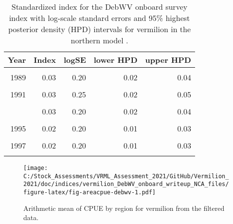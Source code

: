 \documentclass[
]{article}
\begin{document}
\FloatBarrier

\begin{table}

\caption{\label{tab:tab-index-debwv}Standardized index for the DebWV onboard survey index with log-scale standard errors and 95\% highest
       posterior density (HPD) intervals for vermilion in the northern model .}
\centering
\begin{tabular}[t]{rrrrr}
\toprule
Year & Index & logSE & lower HPD & upper HPD\\
\midrule
\cellcolor{gray!6}{1988} & \cellcolor{gray!6}{0.02} & \cellcolor{gray!6}{0.22} & \cellcolor{gray!6}{0.01} & \cellcolor{gray!6}{0.03}\\
1989 & 0.03 & 0.20 & 0.02 & 0.04\\
\cellcolor{gray!6}{1990} & \cellcolor{gray!6}{0.06} & \cellcolor{gray!6}{0.23} & \cellcolor{gray!6}{0.04} & \cellcolor{gray!6}{0.10}\\
1991 & 0.03 & 0.25 & 0.02 & 0.05\\
\cellcolor{gray!6}{1992} & \cellcolor{gray!6}{0.02} & \cellcolor{gray!6}{0.20} & \cellcolor{gray!6}{0.01} & \cellcolor{gray!6}{0.03}\\
\addlinespace
1993 & 0.03 & 0.20 & 0.02 & 0.04\\
\cellcolor{gray!6}{1994} & \cellcolor{gray!6}{0.02} & \cellcolor{gray!6}{0.20} & \cellcolor{gray!6}{0.01} & \cellcolor{gray!6}{0.03}\\
1995 & 0.02 & 0.20 & 0.01 & 0.03\\
\cellcolor{gray!6}{1996} & \cellcolor{gray!6}{0.02} & \cellcolor{gray!6}{0.20} & \cellcolor{gray!6}{0.01} & \cellcolor{gray!6}{0.02}\\
1997 & 0.02 & 0.20 & 0.01 & 0.03\\
\addlinespace
\cellcolor{gray!6}{1998} & \cellcolor{gray!6}{0.02} & \cellcolor{gray!6}{0.20} & \cellcolor{gray!6}{0.01} & \cellcolor{gray!6}{0.03}\\
\bottomrule
\end{tabular}
\end{table}

\FloatBarrier

\begin{figure}
\centering
\texttt{[image: C:/Stock\_Assessments/VRML\_Assessment\_2021/GitHub/Vermilion\_2021/doc/indices/vermilion\_DebWV\_onboard\_writeup\_NCA\_files/figure-latex/fig-areacpue-debwv-1.pdf]}
\caption{\label{fig:fig-areacpue-debwv}Arithmetic mean of CPUE by region for vermilion from the filtered data.}
\end{figure}
\end{document}
